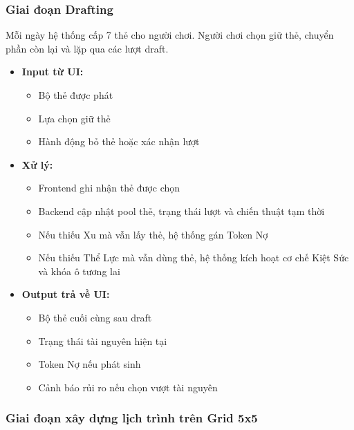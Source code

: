 \subsubsection{Giai đoạn Drafting}

Mỗi ngày hệ thống cấp 7 thẻ cho người chơi. Người chơi chọn giữ thẻ, chuyển phần còn lại và lặp qua các lượt draft.

\begin{itemize}[topsep=0pt, itemsep=2.5pt, leftmargin=1.5cm]
    \item \textbf{Input từ UI:}
    \begin{itemize}[topsep=0pt, itemsep=2pt]
        \item Bộ thẻ được phát
        \item Lựa chọn giữ thẻ
        \item Hành động bỏ thẻ hoặc xác nhận lượt
    \end{itemize}

    \item \textbf{Xử lý:}
    \begin{itemize}[topsep=0pt, itemsep=2pt]
        \item Frontend ghi nhận thẻ được chọn
        \item Backend cập nhật pool thẻ, trạng thái lượt và chiến thuật tạm thời
        \item Nếu thiếu Xu mà vẫn lấy thẻ, hệ thống gán Token Nợ
        \item Nếu thiếu Thể Lực mà vẫn dùng thẻ, hệ thống kích hoạt cơ chế Kiệt Sức và khóa ô tương lai
    \end{itemize}

    \item \textbf{Output trả về UI:}
    \begin{itemize}[topsep=0pt, itemsep=2pt]
        \item Bộ thẻ cuối cùng sau draft
        \item Trạng thái tài nguyên hiện tại
        \item Token Nợ nếu phát sinh
        \item Cảnh báo rủi ro nếu chọn vượt tài nguyên
    \end{itemize}
\end{itemize}

\subsubsection{Giai đoạn xây dựng lịch trình trên Grid 5x5}

